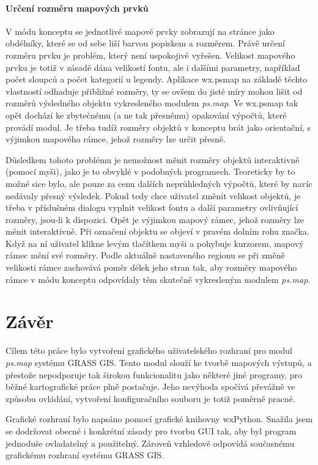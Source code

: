 \documentclass[a4paper,12pt,draft]{article}
\newcommand{\modul}[1]{\emph{#1}}
\begin{document}
 \paragraph*{Určení rozměru mapových prvků}
 V módu konceptu se jednotlivé mapové prvky zobrazují na
 stránce jako obdélníky, které se od sebe liší barvou popiskem
 a rozměrem. Právě určení rozměru prvku je problém, který není
 uspokojivě vyřešen. Velikost mapového prvku je totiž v zásadě dána
 velikostí fontu, ale i dalšími parametry, například počet sloupců
 a počet kategorií u legendy. Aplikace wx.psmap na základě těchto
 vlastností odhaduje přibližné rozměry, ty se ovšem do jisté míry
 mohou lišit od rozměrů výsledného objektu vykresleného modulem
 \modul{ps.map}. Ve wx.psmap tak opět dochází ke zbytečnému (a ne
 tak přesnému) opakování výpočtů, které provádí modul. Je třeba
 tudíž rozměry objektů v konceptu brát jako orientační, s výjimkou
 mapového rámce, jehož rozměry lze určit přesně.

 Důsledkem tohoto problému je nemožnost měnit rozměry objektů
 interaktivně (pomocí myši), jako je to obvyklé v podobných
 programech. Teoreticky by to možné sice bylo, ale pouze za cenu
 dalších neprůhledných výpočtů, které by navíc nedávaly přesný
 výsledek. Pokud tedy chce uživatel změnit velikost objektů, je třeba
 v příslušném dialogu vyplnit velikost fontu a další parametry
 ovlivňující rozměry, jsou-li k dispozici. Opět je výjimkou mapový
 rámec, jehož rozměry lze měnit interaktivně. Při označení objektu
 se objeví v pravém dolním rohu značka. Když na ní uživatel klikne levým
tlačítkem myši a pohybuje kurzorem, mapový rámec mění své rozměry. Podle
aktuálně nastaveného regionu se při změně velikosti rámce zachovává poměr délek
jeho stran tak, aby rozměry mapového rámce v módu konceptu odpovídaly těm
skutečně vykresleným modulem \modul{ps.map}.



\section{Závěr}
Cílem této práce  bylo vytvoření grafického uživatelského rozhraní  pro modul
\modul{ps.map} systému GRASS GIS. Tento modul slouží ke tvorbě mapových
výstupů, a přestože nepodporuje tak širokou funkcionalitu jako některé jiné
programy, pro běžné kartografické práce plně postačuje. Jeho nevýhoda spočívá
převážně ve způsobu ovládání, vytvoření konfiguračního souboru je totiž poměrně
pracné.

Grafické rozhraní bylo napsáno pomocí grafické knihovny wxPython. Snažila jsem
se dodržovat obecné i konkrétní zásady pro tvorbu GUI tak, aby byl program
jednoduše ovladatelný a použitelný. Zároveň vzhledově odpovídá
současnému  grafickému rozhraní systému GRASS GIS.
\end{document}
